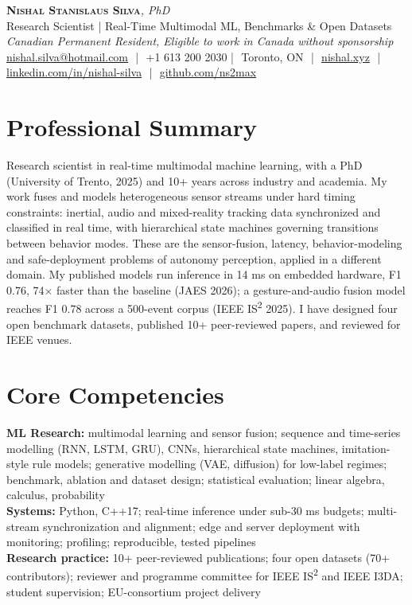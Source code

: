 \documentclass[11pt]{article}
\makeatletter
\newcommand{\cvName}{Nishal Stanislaus Silva}
\newcommand{\cvEmail}{nishal.silva@hotmail.com}
\newcommand{\cvPhone}{+1 613 200 2030}
\newcommand{\cvCity}{Toronto, ON}
\newcommand{\cvSite}{https://nishal.xyz}
\newcommand{\cvLinkedIn}{https://www.linkedin.com/in/nishal-silva}
\newcommand{\cvGitHub}{https://github.com/ns2max}
\newcommand{\cvStatus}{Canadian Permanent Resident, Eligible to work in Canada without sponsorship}
\newcommand{\cvTagline}{Research Scientist | Real-Time Multimodal ML, Benchmarks \& Open Datasets}
\makeatother
\begin{document}
\pagestyle{empty}
\begin{center}
    {\LARGE \scshape \textbf{\cvName}}{\large \textit{, PhD}}\\[1pt]
    {\small \cvTagline}\\[1pt]
    {\footnotesize\textit{\cvStatus}}\\[1pt]
    {\small
    \href{mailto:\cvEmail}{\cvEmail} \,\,|\,\, \cvPhone \,\,|\,\, \cvCity
    \,\,|\,\, \href{\cvSite}{nishal.xyz} \,\,|\,\, \href{\cvLinkedIn}{linkedin.com/in/nishal-silva}
    \,\,|\,\, \href{\cvGitHub}{github.com/ns2max}}
\end{center}

\section*{Professional Summary}

Research scientist in real-time multimodal machine learning, with a PhD (University of Trento, 2025) and 10+ years across industry and academia. My work fuses and models heterogeneous sensor streams under hard timing constraints: inertial, audio and mixed-reality tracking data synchronized and classified in real time, with hierarchical state machines governing transitions between behavior modes. These are the sensor-fusion, latency, behavior-modeling and safe-deployment problems of autonomy perception, applied in a different domain. My published models run inference in 14 ms on embedded hardware, F1 0.76, 74$\times$ faster than the baseline (JAES 2026); a gesture-and-audio fusion model reaches F1 0.78 across a 500-event corpus (IEEE IS\textsuperscript{2} 2025). I have designed four open benchmark datasets, published 10+ peer-reviewed papers, and reviewed for IEEE venues.

\section*{Core Competencies}

\textbf{ML Research:} multimodal learning and sensor fusion; sequence and time-series modelling (RNN, LSTM, GRU), CNNs, hierarchical state machines, imitation-style rule models; generative modelling (VAE, diffusion) for low-label regimes; benchmark, ablation and dataset design; statistical evaluation; linear algebra, calculus, probability\\
\textbf{Systems:} Python, C++17; real-time inference under sub-30 ms budgets; multi-stream synchronization and alignment; edge and server deployment with monitoring; profiling; reproducible, tested pipelines\\
\textbf{Research practice:} 10+ peer-reviewed publications; four open datasets (70+ contributors); reviewer and programme committee for IEEE IS\textsuperscript{2} and IEEE I3DA; student supervision; EU-consortium project delivery
\end{document}
